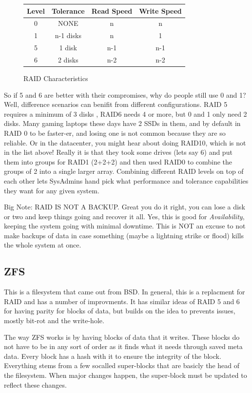 \documentclass[12pt]{article}
\begin{document}
\begin{figure}[ht]
	\centering
	\begin{tabular}{|c|c|c|c|}
	\hline
	Level & Tolerance & Read Speed & Write Speed \\ \hline
	0 & NONE & n & n \\ \hline
	1 & n-1 disks & n & 1 \\ \hline
	5 & 1 disk & n-1 & n-1 \\ \hline
	6 & 2 disks & n-2 & n-2 \\ \hline
	\end{tabular}
	\caption{RAID Characteristics}
	\label{fig:raid_characteristics}
\end{figure}

So if 5 and 6 are better with their compromises, why do people still use 0 and 1?
Well, difference scenarios can benifit from different configurations.
RAID 5 requires a minimum of 3 disks , RAID6 needs 4 or more, but 0 and 1 only need 2 disks.
Many gaming laptops these days have 2 SSDs in them, and by default in RAID 0 to be faster-er, and losing one is not common because they are so reliable.
Or in the datacenter, you might hear about doing RAID10, which is not in the list above!
Really it is that they took some drives (lets say 6) and put them into groups for RAID1 (2+2+2) and then used RAID0 to combine the groups of 2 into a single larger array.
Combining different RAID levels on top of each other lets SysAdmins hand pick what performance and tolerance capabilities they want for any given system.

Big Note: RAID IS NOT A BACKUP.
Great you do it right, you can lose a disk or two and keep things going and recover it all.
Yes, this is good for \textit{Availability}, keeping the system going with minimal downtime.
This is NOT an excuse to not make backups of data in case something (maybe a lightning strike or flood) kills the whole system at once.

\subsection{ZFS}

This is a filesystem that came out from BSD.
In general, this is a replacment for RAID and has a number of improvments.
It has similar ideas of RAID 5 and 6 for having parity for blocks of data, but builds on the idea to prevents issues, mostly bit-rot and the write-hole.

The way ZFS works is by having blocks of data that it writes.
These blocks do not have to be in any sort of order as it finds what it needs through saved meta data.
Every block has a hash with it to ensure the integrity of the block.
Everything stems from a few socalled super-blocks that are basicly the head of the filesystem.
When major changes happen, the super-block must be updated to reflect these changes.
\end{document}
